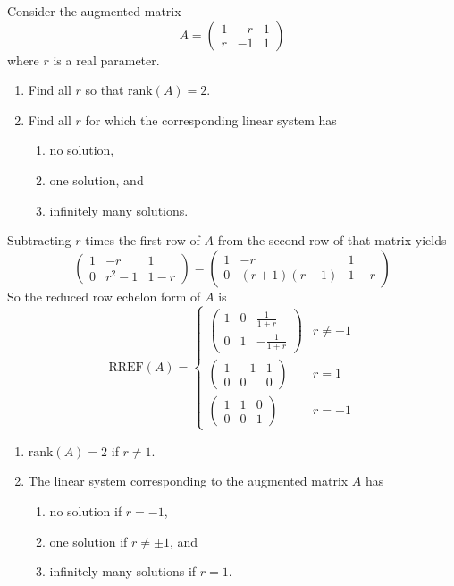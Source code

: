 \documentclass{ximera}
\renewenvironment{solution}{}{}
\begin{document}
\begin{exercise}  \label{A:2.4.2}
Consider the augmented matrix 
\[
A=\left(\begin{array}{cc|c}  
 1 & -r & 1\\  
 r & -1 & 1  
\end{array}\right)
\]
where $r$ is a real parameter. 
\begin{enumerate}
\item Find all $r$ so that $\text{rank}(A)=2$.

\item Find all $r$ for which the corresponding linear system has 
\begin{enumerate}
\item no solution, 
\item one solution, and 
\item infinitely many solutions.
\end{enumerate}
\end{enumerate}

\begin{solution}
\soln Subtracting $r$ times the first row of $A$ from the second row of that matrix yields
\[
\left(\begin{array}{cc|c}  
 1 & -r & 1\\  
 0 & r^2-1 & 1-r 
\end{array}\right)=\left(\begin{array}{cc|c}  
 1 & -r & 1\\  
 0 & (r+1)(r-1) & 1-r 
\end{array}\right)
\]
So the reduced row echelon form of $A$ is
\[
\text{RREF}(A)=\begin{cases}
\left(\begin{array}{cc|c}  
 1 & 0 & \frac{1}{1+r}\\  
 0 & 1 & -\frac{1}{1+r}
\end{array}\right) & r\neq \pm 1\\
\left(\begin{array}{cc|c}  
 1 & -1 & 1\\  
 0 & 0 & 0 
\end{array}\right) & r=1\\
\left(\begin{array}{cc|c}  
 1 & 1 & 0\\  
 0 & 0 & 1 
\end{array}\right) & r=-1
\end{cases}
\]
\begin{enumerate}
\item $\text{rank}(A)=2$ if $r\neq 1$.
\item The linear system corresponding to the augmented matrix $A$ has 
\begin{enumerate}
\item no solution if $r=-1$, 
\item one solution if $r\neq \pm 1$, and  
\item infinitely many solutions if $r=1$.
\end{enumerate}
\end{enumerate}
\end{solution}
\end{exercise}
\end{document}
